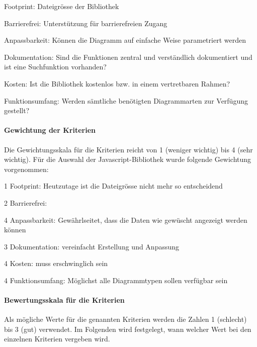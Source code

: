 \begin{itemize*}
\item Footprint: Dateigrösse der Bibliothek
\item Barrierefrei: Unterstützung für barrierefreien Zugang
\item Anpassbarkeit: Können die Diagramm auf einfache Weise parametriert werden
\item Dokumentation: Sind die Funktionen zentral und verständlich dokumentiert und ist eine Suchfunktion vorhanden?
\item Kosten: Ist die Bibliothek kostenlos bzw. in einem vertretbaren Rahmen?
\item Funktionsumfang: Werden sämtliche benötigten Diagrammarten zur Verfügung gestellt?
\end{itemize*}



\paragraph*{Gewichtung der Kriterien}
Die Gewichtungsskala für die Kriterien reicht von 1 (weniger wichtig) bis 4 (sehr wichtig). Für die Auswahl der Javascript-Bibliothek wurde folgende Gewichtung vorgenommen:

\begin{itemize*}
\item 1 Footprint: Heutzutage ist die Dateigrösse nicht mehr so entscheidend
\item 2 Barrierefrei:
\item 4 Anpassbarkeit: Gewährlseitet, dass die Daten wie gewüscht angezeigt werden können
\item 3 Dokumentation: vereinfacht Erstellung und Anpassung
\item 4 Kosten: muss erschwinglich sein
\item 4 Funktionsumfang: Möglichst alle Diagrammtypen sollen verfügbar sein
\end{itemize*}


\paragraph*{Bewertungsskala für die Kriterien}
Als mögliche Werte für die genannten Kriterien werden die Zahlen 1 (schlecht) bis 3 (gut) verwendet. Im Folgenden wird festgelegt, wann welcher Wert bei den einzelnen Kriterien vergeben wird.


